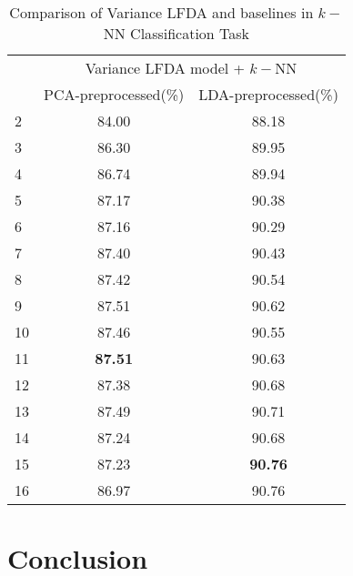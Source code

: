 \documentclass[conference]{IEEEtran}
\begin{document}
\begin{table}[htbp]
	\centering
 	\newcommand{\tabincell}[2]{\begin{tabular}{@{}#1@{}}#2\end{tabular}}
 	\renewcommand\arraystretch{1.0}
 	\caption{Comparison of Variance LFDA and baselines in $k-$NN Classification Task}
 	\label{base3}%
 		\begin{tabular}{@{}p{1cm}<{\centering}|c|c}
 		\hline
 		\multirow{2}{*}{\diagbox[height=2\line,width=1.42cm,font=\tiny]{$k$}{Acc.}{$\mathit{M}$}} &
 		\multicolumn{2}{c}{Variance LFDA model + $k-$NN}\\
 		\cline{2-3}
 		& {PCA-preprocessed(\%)} & {LDA-preprocessed(\%)}\\
 		\hline
 		2   & 84.00 & 88.18\\
 		\hline
 		3   & 86.30 & 89.95\\
 		\hline
 		4   & 86.74 & 89.94\\
 		\hline
 		5   & 87.17 & 90.38\\
 		\hline
 		6   & 87.16 & 90.29\\
 		\hline
 		7   & 87.40 & 90.43\\
 		\hline
 		8   & 87.42 & 90.54\\
 		\hline
 		9   & 87.51 & 90.62\\
 		\hline
 		10   & 87.46 & 90.55\\
 		\hline
 		11   & \textbf{87.51} & 90.63\\
 		\hline
 		12   & 87.38 & 90.68\\
 		\hline
 		13   & 87.49 & 90.71\\
 		\hline
 		14   & 87.24 & 90.68\\
 		\hline
 		15   & 87.23 & \textbf{90.76}\\
 		\hline
 		16   & 86.97 & 90.76\\
 		\hline
 	\end{tabular}
\end{table}

\section{Conclusion}


\end{document}
